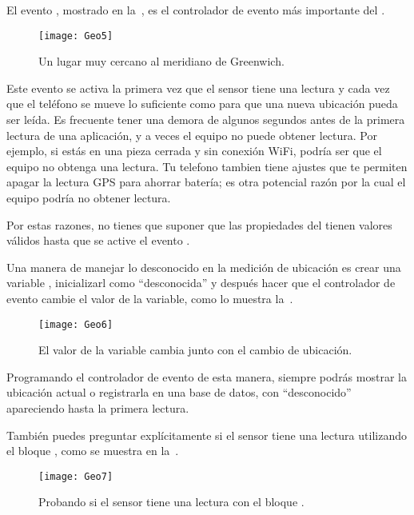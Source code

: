 El evento , mostrado en
la~, es el controlador de evento más importante del
.

\begin{figure}[H]
  \centering
  \texttt{[image: Geo5]}
  \caption{Un lugar muy cercano al meridiano de Greenwich.}
  \label{fig:Geo5}
\end{figure}

Este evento se activa la primera vez que el sensor tiene una lectura y
cada vez que el teléfono se mueve lo suficiente como para que una
nueva ubicación pueda ser leída. Es frecuente tener una demora de
algunos segundos antes de la primera lectura de una aplicación, y a
veces el equipo no puede obtener lectura. Por ejemplo, si estás en una
pieza cerrada y sin conexión WiFi, podría ser que el equipo no obtenga
una lectura. Tu telefono tambien tiene ajustes que te permiten apagar
la lectura GPS para ahorrar batería; es otra potencial razón por la
cual el equipo podría no obtener lectura.

Por estas razones, no tienes que suponer que las propiedades del
 tienen valores válidos hasta que se
active el evento .

Una manera de manejar lo desconocido en la medición de ubicación es crear
una variable , inicializarl como
``desconocida'' y después hacer que el controlador de evento cambie el valor
de la variable, como lo muestra la~.

\begin{figure}[H]
  \centering
  \texttt{[image: Geo6]}
  \caption{El valor de la variable 
    cambia junto con el cambio de ubicación.}
  \label{fig:Geo6}
\end{figure}

Programando el controlador de evento
 de esta manera, siempre
  podrás mostrar la ubicación actual o registrarla en una base de
  datos, con ``desconocido'' apareciendo hasta la primera lectura.

También puedes preguntar explícitamente si el sensor tiene una lectura
utilizando el bloque ,
como se muestra en la~.

\begin{figure}[H]
  \centering
  \texttt{[image: Geo7]}
  \caption{Probando si el sensor tiene una lectura con el bloque .}
  \label{fig:Geo7}
\end{figure}

